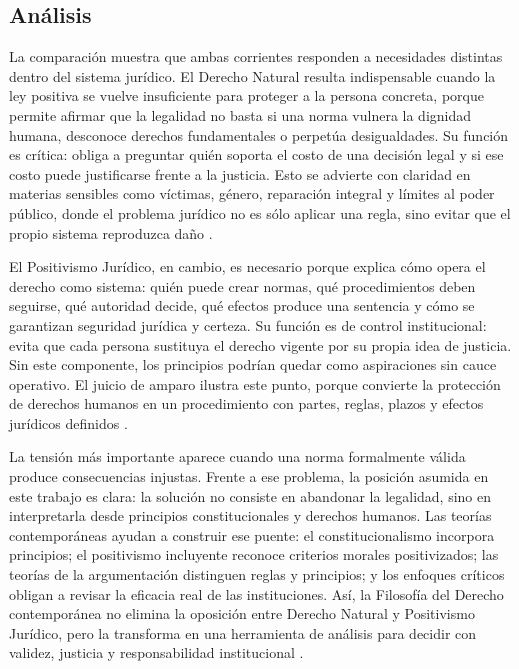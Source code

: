 \documentclass[
	spanish, %
	letterpaper, oneside
]{article}
\begin{document}
\subsection{Análisis}

La comparación muestra que ambas corrientes responden a necesidades distintas dentro del sistema jurídico. El Derecho Natural resulta indispensable cuando la ley positiva se vuelve insuficiente para proteger a la persona concreta, porque permite afirmar que la legalidad no basta si una norma vulnera la dignidad humana, desconoce derechos fundamentales o perpetúa desigualdades. Su función es crítica: obliga a preguntar quién soporta el costo de una decisión legal y si ese costo puede justificarse frente a la justicia. Esto se advierte con claridad en materias sensibles como víctimas, género, reparación integral y límites al poder público, donde el problema jurídico no es sólo aplicar una regla, sino evitar que el propio sistema reproduzca daño \citep{LeyGeneralVictimas,franzoniacevedoLeyGeneralAcceso2017}.

El Positivismo Jurídico, en cambio, es necesario porque explica cómo opera el derecho como sistema: quién puede crear normas, qué procedimientos deben seguirse, qué autoridad decide, qué efectos produce una sentencia y cómo se garantizan seguridad jurídica y certeza. Su función es de control institucional: evita que cada persona sustituya el derecho vigente por su propia idea de justicia. Sin este componente, los principios podrían quedar como aspiraciones sin cauce operativo. El juicio de amparo ilustra este punto, porque convierte la protección de derechos humanos en un procedimiento con partes, reglas, plazos y efectos jurídicos definidos \citep{LeyAmparoReglamentaria}.

La tensión más importante aparece cuando una norma formalmente válida produce consecuencias injustas. Frente a ese problema, la posición asumida en este trabajo es clara: la solución no consiste en abandonar la legalidad, sino en interpretarla desde principios constitucionales y derechos humanos. Las teorías contemporáneas ayudan a construir ese puente: el constitucionalismo incorpora principios; el positivismo incluyente reconoce criterios morales positivizados; las teorías de la argumentación distinguen reglas y principios; y los enfoques críticos obligan a revisar la eficacia real de las instituciones. Así, la Filosofía del Derecho contemporánea no elimina la oposición entre Derecho Natural y Positivismo Jurídico, pero la transforma en una herramienta de análisis para decidir con validez, justicia y responsabilidad institucional \citep{rojas-gonzalezFilosofiaDerecho2018,ruizrodriguezFilosofiaDerecho2009}.
\end{document}
